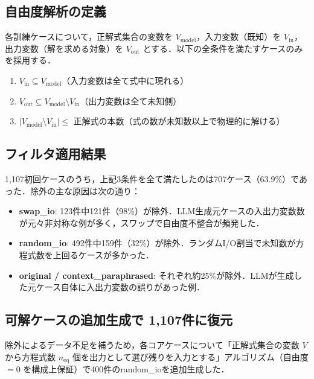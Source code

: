 \documentclass[11pt,a4paper]{ltjsarticle}
\begin{document}
\subsection{自由度解析の定義}

各訓練ケースについて，正解式集合の変数を $V_{\mathrm{model}}$，入力変数（既知）を $V_{\mathrm{in}}$，出力変数（解を求める対象）を $V_{\mathrm{out}}$ とする．以下の全条件を満たすケースのみを採用する．

\begin{enumerate}[leftmargin=2em, nosep]
  \item $V_{\mathrm{in}} \subseteq V_{\mathrm{model}}$（入力変数は全て式中に現れる）
  \item $V_{\mathrm{out}} \subseteq V_{\mathrm{model}} \setminus V_{\mathrm{in}}$（出力変数は全て未知側）
  \item $|V_{\mathrm{model}} \setminus V_{\mathrm{in}}| \le$ 正解式の本数（式の数が未知数以上で物理的に解ける）
\end{enumerate}

\subsection{フィルタ適用結果}

1{,}107初回ケースのうち，上記3条件を全て満たしたのは707ケース（63.9\%）であった．除外の主な原因は次の通り：

\begin{itemize}[leftmargin=2em, nosep]
  \item \textbf{swap\_io}: 123件中121件（98\%）が除外．LLM生成元ケースの入出力変数数が元々非対称な例が多く，スワップで自由度不整合が頻発した．
  \item \textbf{random\_io}: 492件中159件（32\%）が除外．ランダムI/O割当で未知数が方程式数を上回るケースが多かった．
  \item \textbf{original / context\_paraphrased}: それぞれ約25\%が除外．LLMが生成した元ケース自体に入出力変数の誤りがあった例．
\end{itemize}

\subsection{可解ケースの追加生成で 1{,}107件に復元}

除外によるデータ不足を補うため，各コアケースについて「正解式集合の変数 $V$ から方程式数 $n_{\mathrm{eq}}$ 個を出力として選び残りを入力とする」アルゴリズム（自由度 $=0$ を構成上保証）で400件のrandom\_ioを追加生成した．
\end{document}
